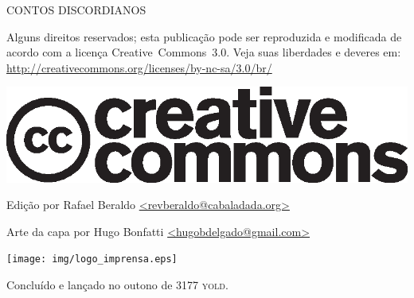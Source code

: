 \begin{center}
{\tiny
CONTOS DISCORDIANOS

\vspace{.5cm}

\begin{minipage}[h]{.6\textwidth}
Alguns direitos reservados; esta publicação pode ser reproduzida e modificada de acordo com a licença \foreignlanguage{english}{Creative~Commons~3.0}. Veja suas liberdades e deveres em: \url{http://creativecommons.org/licenses/by-nc-sa/3.0/br/}
	\begin{center}
	\includegraphics[scale=.2]{img/cc.eps}
	\end{center}
\end{minipage}

\vspace{.5cm}

\begin{minipage}[h]{.6\textwidth}
\centering
Edição por Rafael Beraldo \url{<revberaldo@cabaladada.org>}

	\vspace{.2em}

Arte da capa por Hugo Bonfatti \url{<hugobdelgado@gmail.com>}
\end{minipage}

\vfill

\begin{minipage}[h]{.6\textwidth}
\centering
	\texttt{[image: img/logo\_imprensa.eps]}

Concluído e lançado no outono de 3177 \textsc{yold}.
\end{minipage}
}
\end{center}
\newpage
